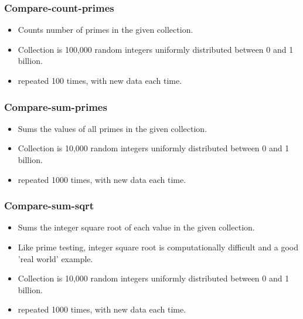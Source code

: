 \documentclass{beamer}
\begin{document}
\begin{frame}
\frametitle{Compare-count-primes}
	\begin{itemize}
	\item Counts number of primes in the given collection.
	\item Collection is 100,000 random integers uniformly distributed between 0 and 1 billion.
	\item repeated 100 times, with new data each time. 
	\end{itemize}
\end{frame}
\begin{frame}
\frametitle{Compare-sum-primes}
	\begin{itemize}
	\item Sums the values of all primes in the given collection.
	\item Collection is 10,000 random integers uniformly distributed between 0 and 1 billion.
	\item repeated 1000 times, with new data each time. 
	\end{itemize}
\end{frame}
\begin{frame}
\frametitle{Compare-sum-sqrt}
	\begin{itemize}
	\item Sums the integer square root of each value in the given collection.
	\item Like prime testing, integer square root is computationally difficult and a good 'real world' example.
	\item Collection is 10,000 random integers uniformly distributed between 0 and 1 billion.
	\item repeated 1000 times, with new data each time. 
	\end{itemize}
\end{frame}
\end{document}
